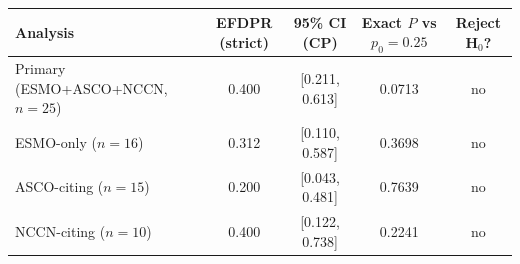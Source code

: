 \begin{tabular}{lcccc}\toprule
Analysis & EFDPR (strict) & 95\% CI (CP) & Exact $P$ vs $p_0=0.25$ & Reject H$_0$? \\ \midrule
Primary (ESMO+ASCO+NCCN, $n=25$) & 0.400 & [0.211, 0.613] & 0.0713 & no \\
ESMO-only ($n=16$) & 0.312 & [0.110, 0.587] & 0.3698 & no \\
ASCO-citing ($n=15$) & 0.200 & [0.043, 0.481] & 0.7639 & no \\
NCCN-citing ($n=10$) & 0.400 & [0.122, 0.738] & 0.2241 & no \\
\bottomrule\end{tabular}
